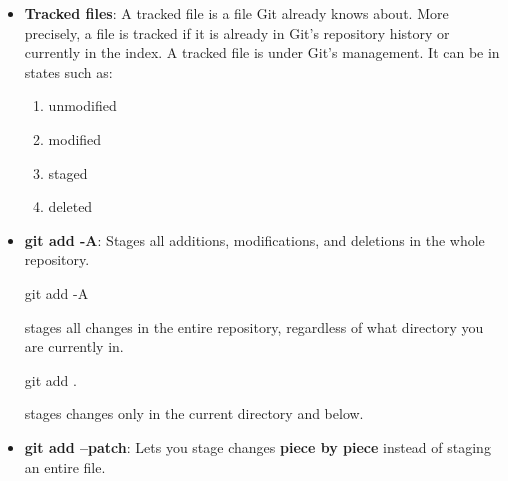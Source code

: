 \documentclass{report}
\begin{document}
\begin{itemize}
            \bigbreak \noindent 
            Shows all changes compared to the last commit, both staged and unstaged.
            \bigbreak \noindent 
            \begin{bashcode}
                git diff commit1 commit2
            \end{bashcode}
            \bigbreak \noindent 
            Shows what changed between two commits
            \bigbreak \noindent 
            \begin{bashcode}
                git diff main feature
            \end{bashcode}
            \bigbreak \noindent 
            Shows the difference between the snapshots pointed to by main and feature.

        \item \textbf{Tracked files}: A tracked file is a file Git already knows about.
            \bigbreak \noindent 
            More precisely, a file is tracked if it is already in Git’s repository history or currently in the index.
            \bigbreak \noindent 
            A tracked file is under Git’s management. It can be in states such as:
            \begin{enumerate}
                \item unmodified
                \item modified
                \item staged
                \item deleted
            \end{enumerate}
        \item \textbf{git add -A}: Stages all additions, modifications, and deletions in the whole repository.
            \bigbreak \noindent 
            \begin{bashcode}
                git add -A
            \end{bashcode}
            \bigbreak \noindent 
            stages all changes in the entire repository, regardless of what directory you are currently in.
            \bigbreak \noindent 
            \begin{bashcode}
                git add .
            \end{bashcode}
            \bigbreak \noindent 
            stages changes only in the current directory and below.
        \item \textbf{git add --patch}: Lets you stage changes \textbf{piece by piece} instead of staging an entire file.
            \bigbreak \noindent 
            \begin{bashcode}

\end{bashcode}
\end{itemize}
\end{document}
